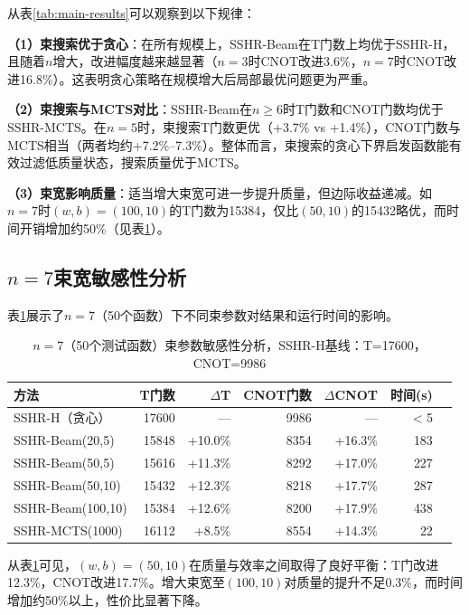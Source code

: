 \documentclass[10.5pt,compsoc,UTF8]{CjC}
\theoremstyle{mystyle}
\begin{document}
从表\ref{tab:main-results}可以观察到以下规律：

\textbf{（1）束搜索优于贪心}：在所有规模上，SSHR-Beam在T门数上均优于SSHR-H，且随着$n$增大，改进幅度越来越显著（$n=3$时CNOT改进3.6\%，$n=7$时CNOT改进16.8\%）。这表明贪心策略在规模增大后局部最优问题更为严重。

\textbf{（2）束搜索与MCTS对比}：SSHR-Beam在$n\ge6$时T门数和CNOT门数均优于SSHR-MCTS。在$n=5$时，束搜索T门数更优（+3.7\% vs +1.4\%），CNOT门数与MCTS相当（两者均约+7.2\%--7.3\%）。整体而言，束搜索的贪心下界启发函数能有效过滤低质量状态，搜索质量优于MCTS。

\textbf{（3）束宽影响质量}：适当增大束宽可进一步提升质量，但边际收益递减。如$n=7$时$(w,b)=(100,10)$的T门数为15384，仅比$(50,10)$的15432略优，而时间开销增加约50\%（见表\ref{tab:beam-params}）。

\subsection{\heiti $n=7$束宽敏感性分析}

表\ref{tab:beam-params}展示了$n=7$（50个函数）下不同束参数对结果和运行时间的影响。

\begin{table}[H]
  \centering
  \caption{$n=7$（50个测试函数）束参数敏感性分析，SSHR-H基线：T=17600，CNOT=9986}
  \label{tab:beam-params}
  \setlength{\tabcolsep}{6pt}
  \begin{tabular}{lrrrrrr}
    \toprule
    方法 & T门数 & $\Delta$T & CNOT门数 & $\Delta$CNOT & 时间(s) \\
    \midrule
    SSHR-H（贪心）       & 17600 & --- & 9986 & --- & $<$5 \\
    SSHR-Beam(20,5)      & 15848 & +10.0\% & 8354 & +16.3\% & 183 \\
    SSHR-Beam(50,5)      & 15616 & +11.3\% & 8292 & +17.0\% & 227 \\
    SSHR-Beam(50,10)     & 15432 & +12.3\% & 8218 & +17.7\% & 287 \\
    SSHR-Beam(100,10)    & 15384 & +12.6\% & 8200 & +17.9\% & 438 \\
    SSHR-MCTS(1000)      & 16112 & +8.5\%  & 8554 & +14.3\% & 22 \\
    \bottomrule
  \end{tabular}
\end{table}

从表\ref{tab:beam-params}可见，$(w,b)=(50,10)$在质量与效率之间取得了良好平衡：T门改进12.3\%，CNOT改进17.7\%。增大束宽至$(100,10)$对质量的提升不足0.3\%，而时间增加约50\%以上，性价比显著下降。
\end{document}
